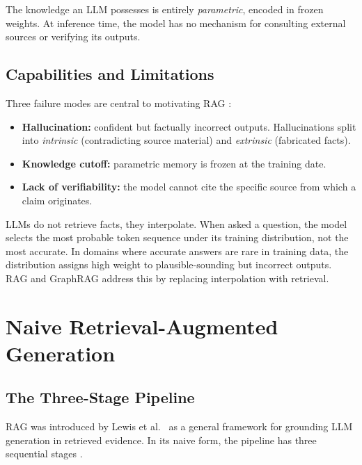 \documentclass[12pt,a4paper,oneside]{report}
\begin{document}
The knowledge an LLM possesses is entirely \emph{parametric}, encoded in
frozen weights. At inference time, the model has no mechanism for consulting
external sources or verifying its outputs.

\subsection{Capabilities and Limitations}

Three failure modes are central to motivating RAG \citep{tonmoy2024}:
\begin{itemize}[leftmargin=2em,itemsep=2pt]
    \item \textbf{Hallucination:} confident but factually incorrect outputs.
          Hallucinations split into \emph{intrinsic} (contradicting source
          material) and \emph{extrinsic} (fabricated facts).
    \item \textbf{Knowledge cutoff:} parametric memory is frozen at the
          training date.
    \item \textbf{Lack of verifiability:} the model cannot cite the specific
          source from which a claim originates.
\end{itemize}

\begin{tcolorbox}[colback=blue!5, colframe=blue!45!black, boxrule=0.4pt,
                  title=\textbf{Why hallucination is structural, not incidental}]
\small
LLMs do not retrieve facts, they interpolate. When asked a question, the
model selects the most probable token sequence under its training
distribution, not the most accurate. In domains where accurate answers are
rare in training data, the distribution assigns high weight to
plausible-sounding but incorrect outputs. RAG and GraphRAG address this by
replacing interpolation with retrieval.
\end{tcolorbox}

\section{Naive Retrieval-Augmented Generation}
\label{sec:lit_naive_rag}

\subsection{The Three-Stage Pipeline}

RAG was introduced by Lewis et al.~\citep{lewis2020} as a general framework for grounding
LLM generation in retrieved evidence. In its naive form, the pipeline has
three sequential stages \citep{gao2023,fan2024}.
\end{document}
